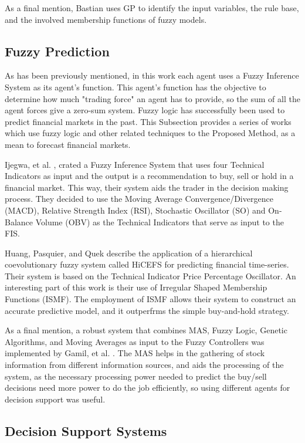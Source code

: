 As a final mention, Bastian \cite{Bastian2000} uses GP to identify the input variables, the rule base, and the involved membership functions of fuzzy models.

\subsection{Fuzzy Prediction}
\label{fuzzy-prediction}

As has been previously mentioned, in this work each agent uses a Fuzzy Inference System as its agent's function. This agent's function has the objective to determine how much "trading force" an agent has to provide, so the sum of all the agent forces give a zero-sum system. Fuzzy logic has successfully been used to predict financial markets in the past. This Subsection provides a series of works which use fuzzy logic and other related techniques to the Proposed Method, as a mean to forecast financial markets.

Ijegwa, et al. \cite{Ijegwa2014}, crated a Fuzzy Inference System that uses four Technical Indicators as input and the output is a recommendation to buy, sell or hold in a financial market. This way, their system aids the trader in the decision making process. They decided to use the Moving Average Convergence/Divergence (MACD), Relative Strength Index (RSI), Stochastic Oscillator (SO) and On-Balance Volume (OBV) as the Technical Indicators that serve as input to the FIS.

Huang, Pasquier, and Quek \cite{Huang2009} describe the application of a hierarchical coevolutionary fuzzy system called HiCEFS for predicting financial time-series. Their system is based on the Technical Indicator Price Percentage Oscillator. An interesting part of this work is their use of Irregular Shaped Membership Functions (ISMF). The employment of ISMF allows their system to construct an accurate predictive model, and it outperfrms the simple buy-and-hold strategy.

As a final mention, a robust system that combines MAS, Fuzzy Logic, Genetic Algorithms, and Moving Averages as input to the Fuzzy Controllers was implemented by Gamil, et al. \cite{Gamil2007}. The MAS helps in the gathering of stock information from different information sources, and aids the processing of the system, as the necessary processing power needed to predict the buy/sell decisions need more power to do the job efficiently, so using different agents for decision support was useful.

\subsection{Decision Support Systems}
\label{decision-support-systems}

